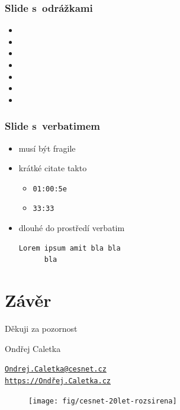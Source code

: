 \documentclass[hyperref={pdfpagelabels=false},xcolor=dvipsnames,12pt,aspectratio=169]{beamer}
\begin{document}
\begin{frame}
	\frametitle{Slide s~odrážkami}
	\begin{itemize}
		\item 
		\item 
		\item 
		\item 
		\item 
		\item 
		\item 
	\end{itemize}
\end{frame}

\begin{frame}[fragile]
	\frametitle{Slide s~verbatimem}
	\begin{itemize}
		\item musí být fragile
		\item krátké citate takto
		\begin{itemize}
				\item \verb|01:00:5e| 
				\item \verb|33:33|
		\end{itemize}
		\item dlouhé do prostředí verbatim
		\begin{verbatim}
Lorem ipsum amit bla bla 
      bla
		\end{verbatim}
	\end{itemize}
\end{frame}

\section*{Závěr}
{
\begin{frame}
 \begin{center}
 \large Děkuji za pozornost

 \vspace{1cm}
 Ondřej Caletka

 \href{mailto:Ondrej.Caletka@cesnet.cz}{\texttt{Ondrej.Caletka@cesnet.cz}} \\
 \href{https://xn--ondej-kcb.caletka.cz}{\texttt{https://Ondřej.Caletka.cz}}
 \begin{figure}
 \texttt{[image: fig/cesnet-20let-rozsirena]}
 \end{figure}
 \end{center}
\end{frame}
}
\end{document}
